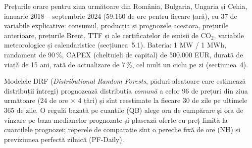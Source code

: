 \textbf{} %
{Prețurile orare pentru ziua următoare din România, Bulgaria, Ungaria și Cehia, ianuarie 2018 -- septembrie 2024 (59.160 de ore pentru fiecare țară), cu 37 de variabile explicative: consumul, producția și prognozele acestora, prețurile anterioare, prețurile Brent, TTF și ale certificatelor de emisii de CO$_2$, variabile meteorologice și calendaristice (secțiunea~5.1).
Bateria: 1 MW / 1 MWh, randament de 90\,\%, CAPEX (cheltuieli de capital) de 500.000 EUR, durată de viață de 15 ani, rată de actualizare de 7\,\%, cel mult un ciclu pe zi (secțiunea~4).}

\textbf{} %
{Modelele DRF (\emph{Distributional Random Forests}, păduri aleatoare care estimează distribuții întregi) prognozează distribuția \emph{comună} a celor 96 de prețuri din ziua următoare (24 de ore $\times$ 4 țări) și sînt reestimate la fiecare 30 de zile pe ultimele 365 de zile.
O regulă bazată pe cuantile (QB) alege ora de cumpărare și ora de vînzare pe baza medianelor prognozate și plasează oferte cu preț limită la cuantilele prognozei; reperele de comparație sînt o pereche fixă de ore (NH) și previziunea perfectă zilnică (PF-Daily).}


